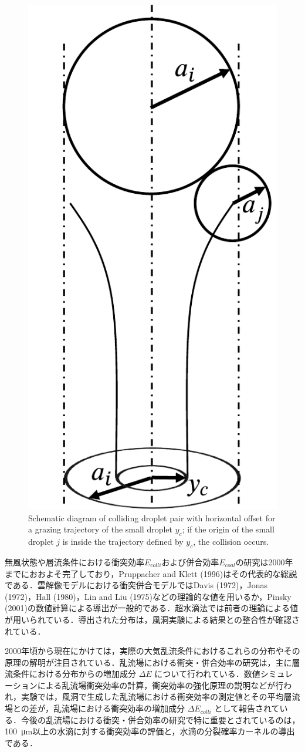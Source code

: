 \begin{figure}[btp]
    \centering
    \includegraphics[width=0.4\linewidth]{./Figure/1_Introduction/yc.pdf}
    \caption{Schematic diagram of colliding droplet pair with horizontal offset for a grazing trajectory of the small droplet $y_c$; if the origin of the small droplet $j$ is inside the trajectory defined by $y_c$, the collision occurs.}
    \label{fig:horizontaloffset}
\end{figure}
無風状態や層流条件における衝突効率$E_{colli}$および併合効率$E_{coal}$の研究は2000年までにおおよそ完了しており，Pruppacher and Klett (1996)\cite{pruppacher1996}はその代表的な総説である．雲解像モデルにおける衝突併合モデルではDavis (1972)\cite{davis1972}，Jonas (1972)\cite{jonas1972}，Hall (1980)\cite{hall1980}，Lin and Liu (1975)\cite{linliu1975}などの理論的な値を用いるか，Pinsky (2001)\cite{pinsky2001}の数値計算による導出が一般的である．超水滴法では前者の理論による値が用いられている．導出された分布は，風洞実験による結果との整合性が確認されている\cite{abbott1974, telford1955, woods1964}．

2000年頃から現在にかけては，実際の大気乱流条件におけるこれらの分布やその原理の解明が注目されている．乱流場における衝突・併合効率の研究は，主に層流条件における分布からの増加成分 $\Delta E$ について行われている．数値シミュレーションによる乱流場衝突効率の計算\cite{pinsky2008Part5}，衝突効率の強化原理の説明\cite{pinsky2007Part4}などが行われ，実験では，風洞で生成した乱流場における衝突効率の測定値とその平均層流場との差が，乱流場における衝突効率の増加成分 $\Delta E_{colli}$ として報告されている\cite{vohl1999}．今後の乱流場における衝突・併合効率の研究で特に重要とされているのは，\SI{100}{\um}以上の水滴に対する衝突効率の評価と，水滴の分裂確率カーネルの導出である\cite{khain2018}．

